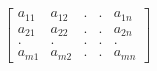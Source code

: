\documentclass[preview]{standalone}
\begin{document}
\begin{align*}
\begin{bmatrix} {a}_{11} & {a}_{12} & . & . & {a}_{1n} \\ {a}_{21} & {a}_{22} & . & . & {a}_{2n} \\ . & . & . & . & . \\ {a}_{m1} & {a}_{m2} & . & . & {a}_{mn}\end{bmatrix}
\end{align*}
\end{document}
